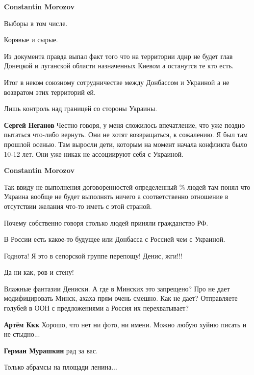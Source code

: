 \begin{itemize}
\begin{itemize}
\textbf{Constantin Morozov} 

Выборы в том числе.

Корявые и сырые.

Из документа правда выпал факт того что на территории лднр не будет глав
Донецкой и луганской области назначенных Киевом а останутся те кто есть.

Итог в неком союзному сотрудничестве между Донбассом и Украиной а не возвратом
этих территорий ей.

Лишь контроль над границей со стороны Украины.

\textbf{Сергей Неганов} Честно говоря, у меня сложилось впечатление, что уже поздно пытаться что-либо вернуть. Они не хотят возвращаться, к сожалению. Я был там прошлой осенью. Там выросли дети, которым на момент начала конфликта было 10-12 лет. Они уже никак не ассоциируют себя с Украиной.

\textbf{Constantin Morozov} 

Так ввиду не выполнения договоренностей определенный \% людей там понял что
Украина вообще не будет выполнять ничего а соответственно отношение в
отсутствии желания что-то иметь с этой страной.

Почему собственно говоря столько людей приняли гражданство РФ.

В России есть какое-то будущее или Донбасса с Россией чем с Украиной.

\end{itemize} %

Годнота! Я это в сепорской группе перепощу! Денис, жги!!!

Да ни как, ров и стену!


Влажные фантазии Дениски. А где в Минских это запрещено? Про не дает
модифицировать Минск, ахаха прям очень смешно. Как не дает? Отправляете голубей
в ООН с предложениями а Россия их перехватывает?

\begin{itemize} %
\textbf{Артём Ккк} Хорошо, что нет ни фото, ни имени. Можно любую хуйню писать и не стыдно...

\textbf{Герман Мурашкин} рад за вас.
\end{itemize} %

Только абрамсы на площади ленина...


\end{itemize}
